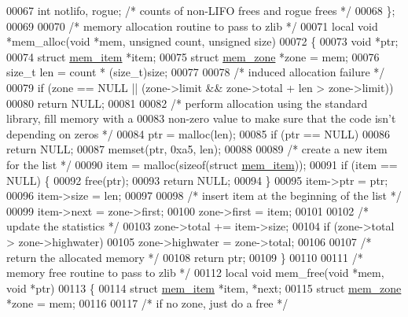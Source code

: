 \begin{DoxyCode}
00067     \textcolor{keywordtype}{int} notlifo, rogue;         \textcolor{comment}{/* counts of non-LIFO frees and rogue frees */}
00068 \};
00069 
00070 \textcolor{comment}{/* memory allocation routine to pass to zlib */}
00071 local \textcolor{keywordtype}{void} *mem\_alloc(\textcolor{keywordtype}{void} *mem, \textcolor{keywordtype}{unsigned} count, \textcolor{keywordtype}{unsigned} size)
00072 \{
00073     \textcolor{keywordtype}{void} *ptr;
00074     \textcolor{keyword}{struct }\hyperlink{structmem__item}{mem\_item} *item;
00075     \textcolor{keyword}{struct }\hyperlink{structmem__zone}{mem\_zone} *zone = mem;
00076     \textcolor{keywordtype}{size\_t} len = count * (size\_t)size;
00077 
00078     \textcolor{comment}{/* induced allocation failure */}
00079     \textcolor{keywordflow}{if} (zone == NULL || (zone->limit && zone->total + len > zone->limit))
00080         \textcolor{keywordflow}{return} NULL;
00081 
00082     \textcolor{comment}{/* perform allocation using the standard library, fill memory with a}
00083 \textcolor{comment}{       non-zero value to make sure that the code isn't depending on zeros */}
00084     ptr = malloc(len);
00085     \textcolor{keywordflow}{if} (ptr == NULL)
00086         \textcolor{keywordflow}{return} NULL;
00087     memset(ptr, 0xa5, len);
00088 
00089     \textcolor{comment}{/* create a new item for the list */}
00090     item = malloc(\textcolor{keyword}{sizeof}(\textcolor{keyword}{struct} \hyperlink{structmem__item}{mem\_item}));
00091     \textcolor{keywordflow}{if} (item == NULL) \{
00092         free(ptr);
00093         \textcolor{keywordflow}{return} NULL;
00094     \}
00095     item->ptr = ptr;
00096     item->size = len;
00097 
00098     \textcolor{comment}{/* insert item at the beginning of the list */}
00099     item->next = zone->first;
00100     zone->first = item;
00101 
00102     \textcolor{comment}{/* update the statistics */}
00103     zone->total += item->size;
00104     \textcolor{keywordflow}{if} (zone->total > zone->highwater)
00105         zone->highwater = zone->total;
00106 
00107     \textcolor{comment}{/* return the allocated memory */}
00108     \textcolor{keywordflow}{return} ptr;
00109 \}
00110 
00111 \textcolor{comment}{/* memory free routine to pass to zlib */}
00112 local \textcolor{keywordtype}{void} mem\_free(\textcolor{keywordtype}{void} *mem, \textcolor{keywordtype}{void} *ptr)
00113 \{
00114     \textcolor{keyword}{struct }\hyperlink{structmem__item}{mem\_item} *item, *next;
00115     \textcolor{keyword}{struct }\hyperlink{structmem__zone}{mem\_zone} *zone = mem;
00116 
00117     \textcolor{comment}{/* if no zone, just do a free */}

\end{DoxyCode}
